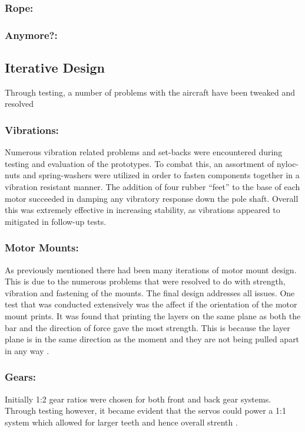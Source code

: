 \subsubsection*{Rope:}  

\subsubsection*{Anymore?:}

\subsection{Iterative Design}
Through testing, a number of problems with the aircraft have been tweaked and resolved

\subsubsection*{Vibrations:} Numerous vibration related problems and set-backs were encountered during testing and evaluation of the prototypes. To combat this, an assortment of nyloc-nuts and spring-washers were utilized in order to fasten components together in a vibration resistant manner. The addition of four rubber ``feet'' to the base of each motor succeeded in damping any vibratory response down the pole shaft. Overall this was extremely effective in increasing stability, as vibrations appeared to mitigated in follow-up tests.

\subsubsection*{Motor Mounts:} As previously mentioned there had been many iterations of motor mount design. This is due to the numerous problems that were resolved to do with strength, vibration and fastening of the mounts. The final design addresses all issues. One test that was conducted extensively was the affect if the orientation of the motor mount prints. It was found that printing the layers on the same plane as both the bar and the direction of force gave the most strength. This is because the layer plane is in the same direction as the moment and they are not being pulled apart in any way . 

\subsubsection*{Gears:} Initially 1:2 gear ratios were chosen for both front and back gear systems. Through testing however, it became evident that the servos could power a 1:1 system which allowed for larger teeth and hence overall strenth .

